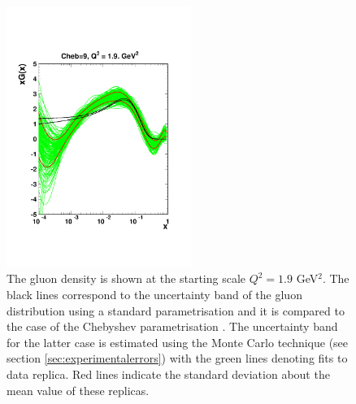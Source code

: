 \begin{figure}[!ht]
 \centering
  \includegraphics[trim=1cm 4cm 1cm 5cm, clip, width=6cm]{chebishev.pdf}
  \caption{The gluon density is shown at the starting scale $Q^2=1.9$ GeV$^2$. The black lines correspond to the uncertainty band of the gluon distribution using a standard parametrisation and it is compared to the case of the Chebyshev parametrisation \cite{Chebyshev}. The uncertainty band for the latter case is estimated using the Monte Carlo technique (see section \ref{sec:experimentalerrors}) with the green lines denoting fits to data replica.  Red lines indicate the standard deviation about the mean value of these replicas.}
 \label{fig:cheb}
\end{figure}

%
